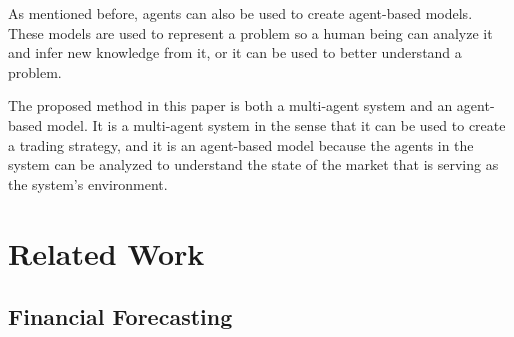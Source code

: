 \documentclass{ieeeaccess}
\begin{document}
As mentioned before, agents can also be used to create agent-based models. These
models are used to represent a problem so a human being can analyze it and infer
new knowledge from it, or it can be used to better understand a problem.

The proposed method in this paper is both a multi-agent system and an
agent-based model. It is a multi-agent system in the sense that it can be used
to create a trading strategy, and it is an agent-based model because the agents
in the system can be analyzed to understand the state of the market that is
serving as the system's environment.



\section{Related Work}
\label{section:related-work}

\subsection{Financial Forecasting}
\label{subsection:financial-forecasting}


\end{document}
